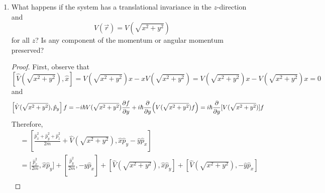 \documentclass[../psets.tex]{subfiles}
\begin{document}
\begin{enumerate}
\begin{enumerate}
\begin{proof}
\begin{align*}
                &= i\hbar\hat{y}\pdv{V}{z}
            \end{align*}
            Returning to the original set of equations, from line 3 to line 4, we evaluated the last two commutators and applied the chain rule. From line 4 to line 5, we algebraically expanded and cancelled everything (using $r=\sqrt{x^2+y^2+z^2}$ for the partial derivatives).\par
            Moving on, similar to the above, we obtain that
            \begin{equation*}
                [\hat{H},\hat{L}_y] = [\hat{H},\hat{L}_z] = 0
            \end{equation*}
            Thus, by bilinearity once more,
            \begin{equation*}
                [\hat{H},\hat{\vec{L}}] = [\hat{H},\hat{L}_x+\hat{L}_y+\hat{L}_z] = 0
            \end{equation*}
        \end{proof}
        \item What happens if the system has a translational invariance in the $z$-direction and
        \begin{equation}
            V(\vec{r}) = V(\sqrt{x^2+y^2})
        \end{equation}
        for all $z$? Is any component of the momentum or angular momentum preserved?
        \begin{proof}
            First, observe that
            \begin{equation*}
                \left[ \hat{V}(\sqrt{x^2+y^2}),\hat{x} \right] = V(\sqrt{x^2+y^2})x-xV(\sqrt{x^2+y^2})
                = V(\sqrt{x^2+y^2})x-V(\sqrt{x^2+y^2})x
                = 0
            \end{equation*}
            and
            \begin{equation*}
                \left[ \hat{V}(\sqrt{x^2+y^2}),\hat{p}_y \right]f = -i\hbar V(\sqrt{x^2+y^2})\pdv{f}{y}+i\hbar\pdv{y}(V(\sqrt{x^2+y^2})f) = i\hbar\pdv{y}[V(\sqrt{x^2+y^2})]f
            \end{equation*}
            Therefore,
            \begin{align*}
                [\hat{H},\hat{L}_z] &= \left[ \frac{\hat{p}_x^2+\hat{p}_y^2+\hat{p}_z^2}{2m}+\hat{V}(\sqrt{x^2+y^2}),\hat{x}\hat{p}_y-\hat{y}\hat{p}_x \right]\\
                &= \Bigg[ \frac{\hat{p}_x^2}{2m},\hat{x}\hat{p}_y \Bigg]+\left[ \frac{\hat{p}_y^2}{2m},-\hat{y}\hat{p}_x \right]+\left[ \hat{V}(\sqrt{x^2+y^2}),\hat{x}\hat{p}_y \right]+\left[ \hat{V}(\sqrt{x^2+y^2}),-\hat{y}\hat{p}_x \right]\\

\end{align*}
\end{proof}
\end{enumerate}
\end{enumerate}
\end{document}
